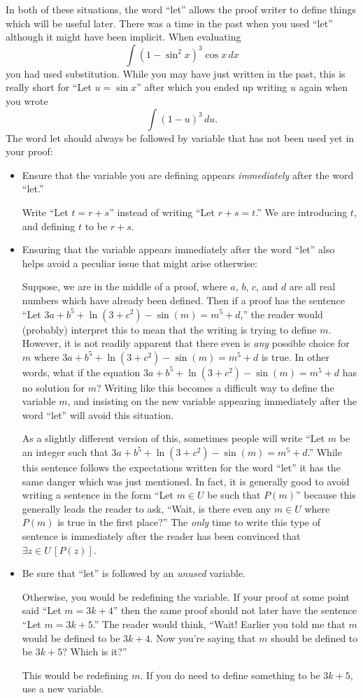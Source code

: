\documentclass{book}
\theoremstyle{ekimcustom}
\begin{document}
In both of these situations, the word ``let'' allows the proof writer to define things which will be useful later. There was a time in the past when you used ``let'' although it might have been implicit. When evaluating
\[ \int (1-\sin^2 x)^3 \cos x\,dx\]
you had used substitution. While you may have just written  in the past, this is really short for ``Let $u=\sin x$'' after which you ended up writing $u$ again when you wrote
\[ \int (1-u)^3\,du.\]
The word let should always be followed by variable that has not been used yet in your proof:
\begin{itemize}
\item Ensure that the variable you are defining appears \emph{immediately} after the word ``let.'' 

Write ``Let $t=r+s$'' instead of writing ``Let $r+s=t$.'' We are introducing $t$, and defining $t$ to be $r+s$.

\item Ensuring that the variable appears immediately after the word ``let'' also helps avoid a peculiar issue that might arise otherwise:

Suppose, we are in the middle of a proof, where $a$, $b$, $c$, and $d$ are all real numbers which have already been defined. Then if a proof has the sentence ``Let $3a + b^5 + \ln(3+c^2) - \sin(m) = m^5 + d$,'' the reader would (probably) interpret this to mean that the writing is trying to define $m$. However, it is not readily apparent that there even is \emph{any} possible choice for $m$ where $3a + b^5 + \ln(3+c^2) - \sin(m) = m^5 + d$ is true. In other words, what if the equation $3a + b^5 + \ln(3+c^2) - \sin(m) = m^5 + d$ has no solution for $m$? Writing like this becomes a difficult way to define the variable $m$, and insisting on the new variable appearing immediately after the word ``let'' will avoid this situation.

As a slightly different version of this, sometimes people will write ``Let $m$ be an integer such that $3a + b^5 + \ln(3+c^2) - \sin(m) = m^5 + d$.'' While this sentence follows the expectations written for the word ``let'' it has the same danger which was just mentioned. In fact, it is generally good to avoid writing a sentence in the form ``Let $m \in U$ be such that $P(m)$'' because this generally leads the reader to ask, ``Wait, is there even any $m \in U$ where $P(m)$ is true in the first place?'' The \emph{only} time to write this type of sentence is immediately after the reader has been convinced that $\exists z \in U\,[P(z)]$.

\item Be sure that ``let'' is followed by an \emph{unused} variable.

Otherwise, you would be redefining the variable. If your proof at some point said ``Let $m=3k+4$'' then the same proof should not later have the sentence ``Let $m=3k+5$.'' The reader would think, ``Wait! Earlier you told me that $m$ would be defined to be $3k+4$. Now you're saying that $m$ should be defined to be $3k+5$? Which is it?''

This would be redefining $m$. If you do need to define something to be $3k+5$, use a new variable.
\end{itemize}
\end{document}
